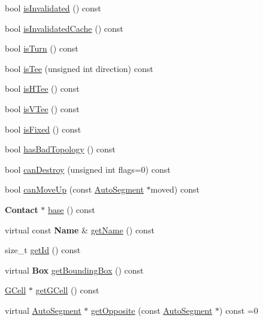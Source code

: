 \begin{DoxyCompactItemize}
bool \hyperlink{classKatabatic_1_1AutoContact_a54f713d06c43bebf4e0dfef06e347531}{is\-Invalidated} () const 
\item 
bool \hyperlink{classKatabatic_1_1AutoContact_af715dc65deddf045ec1743a529393224}{is\-Invalidated\-Cache} () const 
\item 
bool \hyperlink{classKatabatic_1_1AutoContact_aa7c7bc6592b91fe675acb9b793b1188e}{is\-Turn} () const 
\item 
bool \hyperlink{classKatabatic_1_1AutoContact_a8fd7a3439896837a5af19d408162ca62}{is\-Tee} (unsigned int direction) const 
\item 
bool \hyperlink{classKatabatic_1_1AutoContact_ac2131e4356f7d7c6e4ada597307f1d95}{is\-H\-Tee} () const 
\item 
bool \hyperlink{classKatabatic_1_1AutoContact_a938932aae592e22efdc9b275ad5a4094}{is\-V\-Tee} () const 
\item 
bool \hyperlink{classKatabatic_1_1AutoContact_af5e7d3badddf2ec07159f1d83426d4c1}{is\-Fixed} () const 
\item 
bool \hyperlink{classKatabatic_1_1AutoContact_a1aebd841bb4796ac0f4264d6a694d6fa}{has\-Bad\-Topology} () const 
\item 
bool \hyperlink{classKatabatic_1_1AutoContact_aa1d158503e0663092922e38651b8c9f5}{can\-Destroy} (unsigned int flags=0) const 
\item 
bool \hyperlink{classKatabatic_1_1AutoContact_a3b30ff8ac1916f6cf9f9be735a3d9c3a}{can\-Move\-Up} (const \hyperlink{classKatabatic_1_1AutoSegment}{Auto\-Segment} $\ast$moved) const 
\item 
{\bf Contact} $\ast$ \hyperlink{classKatabatic_1_1AutoContact_a7f6571edacd5e4120cc9b87abd23082a}{base} () const 
\item 
virtual const {\bf Name} \& \hyperlink{classKatabatic_1_1AutoContact_a5e23c46b801d3049b349b68774a0d298}{get\-Name} () const 
\item 
size\-\_\-t \hyperlink{classKatabatic_1_1AutoContact_ac0015de06fff235f96ec1cf68444f7a4}{get\-Id} () const 
\item 
virtual {\bf Box} \hyperlink{classKatabatic_1_1AutoContact_a3b9694bf093e3ea16e4a8c8126a8d4db}{get\-Bounding\-Box} () const 
\item 
\hyperlink{classKatabatic_1_1GCell}{G\-Cell} $\ast$ \hyperlink{classKatabatic_1_1AutoContact_ab45ccfee0f781ec16c50672663d36141}{get\-G\-Cell} () const 
\item 
virtual \hyperlink{classKatabatic_1_1AutoSegment}{Auto\-Segment} $\ast$ \hyperlink{classKatabatic_1_1AutoContact_a48ab1d3bdf85712e4784ef83ef136939}{get\-Opposite} (const \hyperlink{classKatabatic_1_1AutoSegment}{Auto\-Segment} $\ast$) const =0

\end{DoxyCompactItemize}
